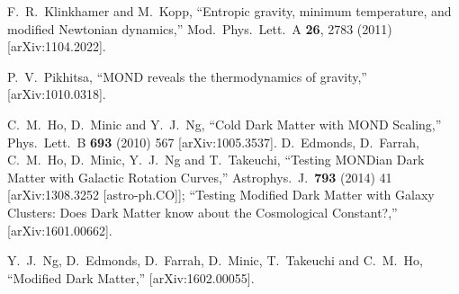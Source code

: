 \documentclass[a4paper,12pt]{article}
\begin{document}
\begin{thebibliography}{100}







 F.~R.~Klinkhamer and M.~Kopp,
 ``Entropic gravity, minimum temperature, and modified Newtonian dynamics,''
 Mod.\ Phys.\ Lett.\ A {\bf 26}, 2783 (2011)
 [arXiv:1104.2022].

 P.~V.~Pikhitsa,
 ``MOND reveals the thermodynamics of gravity,''
 [arXiv:1010.0318].



  C.~M.~Ho, D.~Minic and Y.~J.~Ng,
  ``Cold Dark Matter with MOND Scaling,''
  Phys.\ Lett.\ B {\bf 693} (2010) 567
  [arXiv:1005.3537].
  D.~Edmonds, D.~Farrah, C.~M.~Ho, D.~Minic, Y.~J.~Ng and T.~Takeuchi,
  ``Testing MONDian Dark Matter with Galactic Rotation Curves,''
  Astrophys.\ J.\  {\bf 793} (2014) 41
  [arXiv:1308.3252 [astro-ph.CO]];
  ``Testing Modified Dark Matter with Galaxy Clusters: Does Dark Matter know about the Cosmological Constant?,''
  [arXiv:1601.00662].
  
  Y.~J.~Ng, D.~Edmonds, D.~Farrah, D.~Minic, T.~Takeuchi and C.~M.~Ho,
  ``Modified Dark Matter,''
  [arXiv:1602.00055].
  



\end{thebibliography}
\end{document}
